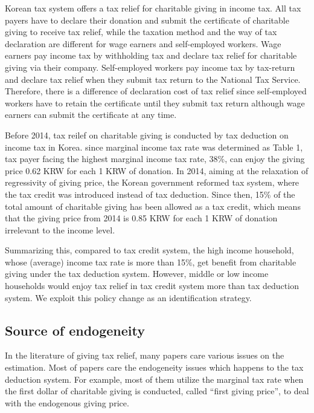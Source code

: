 \documentclass[
  11pt,
  a4paper,
]{article}
\begin{document}
Korean tax system offers a tax relief for charitable giving in income tax. All tax payers have to declare their donation and submit the certificate of charitable giving to receive tax relief, while the taxation method and the way of tax declaration are different for wage earners and self-employed workers. Wage earners pay income tax by withholding tax and declare tax relief for charitable giving via their company. Self-employed workers pay income tax by tax-return and declare tax relief when they submit tax return to the National Tax Service. Therefore, there is a difference of declaration cost of tax relief since self-employed workers have to retain the certificate until they submit tax return although wage earners can submit the certificate at any time.

Before 2014, tax reilef on charitable giving is conducted by tax deduction on income tax in Korea. since marginal income tax rate was determined as Table 1, tax payer facing the highest marginal income tax rate, 38\%, can enjoy the giving price 0.62 KRW for each 1 KRW of donation. In 2014, aiming at the relaxation of regressivity of giving price, the Korean government reformed tax system, where the tax credit was introduced instead of tax deduction. Since then, 15\% of the total amount of charitable giving has been allowed as a tax credit, which means that the giving price from 2014 is 0.85 KRW for each 1 KRW of donation irrelevant to the income level.

Summarizing this, compared to tax credit system, the high income household, whose (average) income tax rate is more than 15\%, get benefit from charitable giving under the tax deduction system. However, middle or low income households would enjoy tax relief in tax credit system more than tax deduction system. We exploit this policy change as an identification strategy.

\hypertarget{source-of-endogeneity}{%
\subsection{Source of endogeneity}\label{source-of-endogeneity}}

In the literature of giving tax relief, many papers care various issues on the estimation. Most of papers care the endogeneity issues which happens to the tax deduction system. For example, most of them utilize the marginal tax rate when the first dollar of charitable giving is conducted, called ``first giving price'', to deal with the endogenous giving price.
\end{document}
